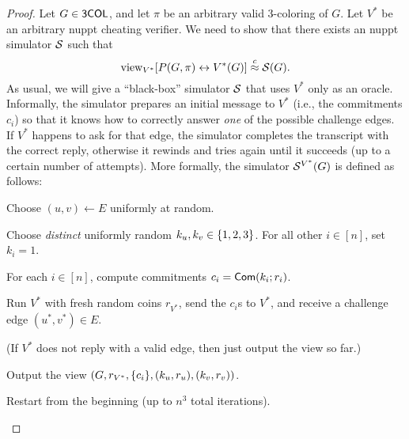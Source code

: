 \documentclass[11pt]{article}
\begin{document}
\begin{proof}
  Let $G \in \mathsf{3COL}$, and let $\pi$ be an arbitrary valid $3$-coloring
  of $G$.  Let $V^{*}$ be an arbitrary nuppt cheating verifier.  We
  need to show that there exists an nuppt simulator $\mathcal{S}$ such
  that \[\text{view}_{V^{*}}[P(G,\pi) \leftrightarrow V^{*}(G)] \stackrel{c}{\approx}
  \mathcal{S}(G). \] As usual, we will give a ``black-box'' simulator $\mathcal{S}$
  that uses $V^{*}$ only as an oracle.  Informally, the simulator
  prepares an initial message to $V^{*}$ (i.e., the commitments
  $c_{i}$) so that it knows how to correctly answer \emph{one} of the
  possible challenge edges.  If $V^{*}$ happens to ask for that edge,
  the simulator completes the transcript with the correct reply,
  otherwise it rewinds and tries again until it succeeds (up to a
  certain number of attempts).  More formally, the simulator
  $\mathcal{S}^{V^{*}}(G)$ is defined as follows:
  \begin{algorithmic}[1]
    \STATE Choose $(u, v) \gets E$ uniformly at random.
    
    \STATE Choose \emph{distinct} uniformly random $k_{u}, k_{v} \in
    \{1,2,3\}$.  For all other $i \in [n]$, set $k_{i} = 1$.
    
    \STATE For each $i \in [n]$, compute commitments $c_{i} =
    \mathsf{Com}(k_{i}; r_{i})$.

    \STATE Run $V^{*}$ with fresh random coins $r_{V^{*}}$, send the
    $c_{i}$s to $V^{*}$, and receive a challenge edge $(u^{*},v^{*})
    \in E$.
    
    (If $V^{*}$ does not reply with a valid edge, then just
    output the view so far.)

    
    \STATE Output the view $(G, r_{V^{*}}, \{c_{i}\}, (k_{u},
    r_{u}), (k_{v}, r_{v}))$.

    \ELSE

    \STATE Restart from the beginning (up to $n^{3}$ total
    iterations).

    \ENDIF
  \end{algorithmic}
  

\end{proof}
\end{document}
